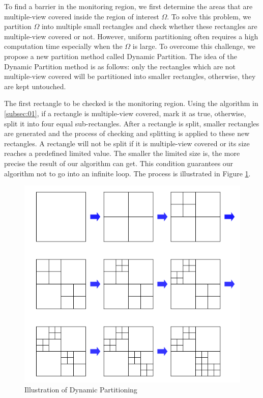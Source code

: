 To find a barrier in the monitoring region, we first determine the areas that are multiple-view covered inside the region of interest $\Omega$. To solve this problem, we partition $\Omega$ into multiple small rectangles and check whether these rectangles are multiple-view covered or not. However, uniform partitioning often requires a high computation time especially when the $\Omega$ is large. To overcome this challenge, we propose a new partition method called Dynamic Partition. The idea of the Dynamic Partition method is as follows: only the rectangles which are not multiple-view covered will be partitioned into smaller rectangles, otherwise, they are kept untouched. \par
The first rectangle to be checked is the monitoring region. 
Using the algorithm in \ref{subsec:01}, if a rectangle is multiple-view covered, mark it as true, otherwise, split it into four equal sub-rectangles. After a rectangle is split, smaller rectangles are generated and the process of checking and splitting is applied to these new rectangles. A rectangle will not be split if it is multiple-view covered or its size reaches a predefined limited value. The smaller the limited size is, the more precise the result of our algorithm can get. This condition guarantees our algorithm not to go into an infinite loop. The process is illustrated in Figure \ref{dynamic}.
%
\begin{figure}[h]
	\begin{center}
		\includegraphics[scale=1.]{Dynamic_Partition.pdf}
	\end{center}
	\caption{Illustration of Dynamic Partitioning}
	\label{dynamic}
\end{figure}


